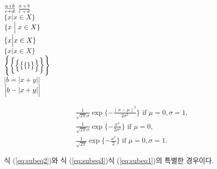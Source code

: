 \documentclass[11pt]{article}
\begin{document}
${a+b \over c+d}$ $\frac{a+b}{c+d}$ \\

$\{ x\Big | x\in X\}$ \\

$\{x\Bigm | x\in X\}$ \\

$\{x \Bigl | x\in X\}$ \\

$\{x \Bigr | x\in X\}$ \\

$\Biggl \{ \biggl \{ \Bigl \{ \bigl \{ \{ \} \bigr \} \Bigr \} \biggr \} \Biggr \}$ \\

$|b=|x+y||$ \\

$\Bigl | b-|x+y| \Bigr |$


\begin{subequations}
\begin{align}
& \frac{1}{\sqrt{2\pi}\sigma}\exp\{-\frac{(x-\mu)^2}{2\sigma^2}\}\mbox{ if } \mu=0, \sigma=1, \label{eq:subeq1} \\
& \frac{1}{\sqrt{2\pi}\sigma}\exp\{-\frac{x^x}{2\sigma^2}\}\mbox{ if } \mu=0, \label{eq:subeq2} \\
& \frac{1}{\sqrt{2\pi}} \exp\{-\frac{x^2}{2}\} \mbox{ if } \mu=0, \sigma=1. \label{eq:subeq3}
\end{align}
\end{subequations}

식 (\ref{eq:subeq2})와 식 (\ref{eq:subeq3})\는 식 (\ref{eq:subeq1})의 특별한 경우이다.
\end{document}
